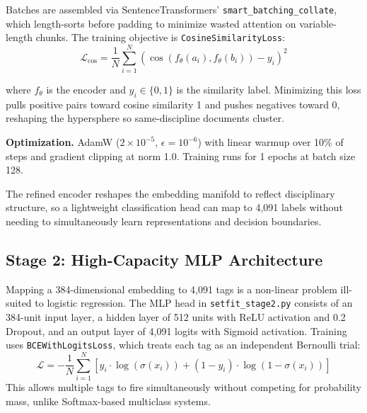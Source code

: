 \documentclass[10pt,journal,compsoc]{IEEEtran}
\newcommand{\NumTags}{4,091}
\newcommand{\StageOneEpochs}{1}
\newcommand{\StageOneBatch}{128}
\newcommand{\StageOneLR}{2\times10^{-5}}
\newcommand{\MLPHiddenDim}{512}
\newcommand{\MLPDropout}{0.2}
\newcommand{\EncoderDim}{384}
\begin{document}
	Batches are assembled via SentenceTransformers' \texttt{smart\_batching\_collate},
	which length-sorts before padding to minimize wasted attention on variable-length
	chunks. The training objective is \texttt{CosineSimilarityLoss}:
	\begin{equation}
		\mathcal{L}_{\text{cos}} = \frac{1}{N}\sum_{i=1}^{N}
		\left( \cos(f_\theta(a_i), f_\theta(b_i)) - y_i \right)^2
	\end{equation}
	
	where $f_\theta$ is the encoder and $y_i \in \{0, 1\}$ is the similarity label.
	Minimizing this loss pulls positive pairs toward cosine similarity 1 and pushes
	negatives toward 0, reshaping the hypersphere so same-discipline documents cluster.
	
	\textbf{Optimization.} AdamW ($\StageOneLR$, $\epsilon{=}10^{-6}$) with linear
	warmup over 10\% of steps and gradient clipping at norm 1.0. Training runs for
	\StageOneEpochs{} epochs at batch size \StageOneBatch{}.
	
	The refined encoder reshapes the embedding manifold to reflect disciplinary structure, so a lightweight classification head can map to \NumTags{} labels without needing to simultaneously learn representations and decision boundaries.
	
	\subsection{Stage 2: High-Capacity MLP Architecture}
	Mapping a \EncoderDim{}-dimensional embedding to \NumTags{} tags is a non-linear problem ill-suited to logistic regression. The MLP head in \texttt{setfit\_stage2.py} consists of an \EncoderDim{}-unit input layer, a hidden layer of \MLPHiddenDim{} units with ReLU activation and \MLPDropout{} Dropout, and an output layer of \NumTags{} logits with Sigmoid activation. Training uses \texttt{BCEWithLogitsLoss}, which treats each tag as an independent Bernoulli trial:
	\begin{equation}
		\mathcal{L} = -\frac{1}{N} \sum_{i=1}^{N}
		[y_i \cdot \log(\sigma(x_i)) + (1-y_i) \cdot \log(1-\sigma(x_i))]
	\end{equation}
	This allows multiple tags to fire simultaneously without competing for probability mass, unlike Softmax-based multiclass systems.
	
\end{document}
